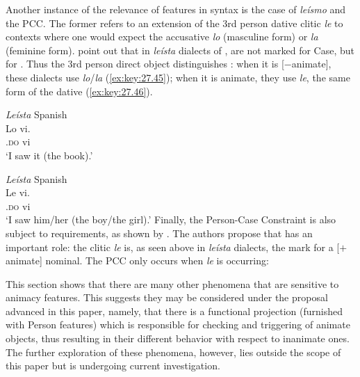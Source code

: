 \documentclass[output=paper]{langsci/langscibook}
\begin{document}
Another instance of the relevance of  features in syntax is the case of
\emph{leísmo} and the \gls{PCC}. The former refers to an extension of the 3rd
person dative clitic \emph{le} to contexts where one would expect the
accusative  \emph{lo} (masculine form) or \emph{la} (feminine form).
\citet[319--320]{OrmazabalRomero2013} point out that in \emph{leísta} dialects
of ,  are not marked for Case, but for . Thus the 3rd
person direct object distinguishes : when it is [$-$animate], these
dialects use \emph{lo}/\emph{la} (\ref{ex:key:27.45}); when it is animate, they
use \emph{le}, the same form of the dative (\ref{ex:key:27.46}).

\ea\label{ex:key:27.45} \emph{Leísta} Spanish\\
    \gll    Lo vi.\\
            \Tsg{}.\textsc{do} vi\\
    \glt    `I saw it (the book).'
\z

\ea\label{ex:key:27.46} \emph{Leísta} Spanish\\
    \gll    Le vi.\\
            \Tsg{}.\textsc{do}   vi\\
    \glt    `I saw him/her (the boy/the girl).'
\z
Finally, the Person-Case Constraint is also subject to  requirements, as
shown by \citet{OrmazabalRomero2007,OrmazabalRomero2013}. The authors propose that  has
an important role: the clitic \emph{le} is, as seen above in \emph{leísta}
dialects, the mark for a [$+$animate] nominal. The \gls{PCC} only occurs when \emph{le} is occurring:\newpage

\ea\label{ex:key:27.47} 
    \z
\z
This section shows that there are many other phenomena that are sensitive to
animacy features. This suggests they may be considered under the proposal
advanced in this paper, namely, that there is a functional projection
(furnished with Person features) which is responsible for checking and
triggering  of animate objects, thus resulting in their different
behavior with respect to inanimate ones. The further exploration of these
phenomena, however, lies outside the scope of this paper but is undergoing
current investigation.
\end{document}
